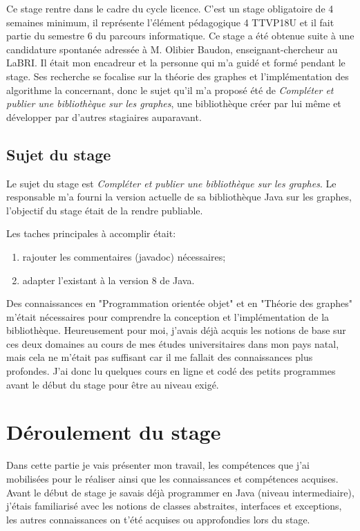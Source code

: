 \documentclass[12pt]{report}
\begin{document}
Ce stage rentre dans le cadre du cycle licence. C'est un stage obligatoire de 4 semaines minimum, il représente l'élément pédagogique 4 TTVP18U et il fait partie du semestre 6 du parcours informatique. Ce stage a été obtenue suite à une candidature spontanée adressée à M. Olibier Baudon, enseignant-chercheur au LaBRI. Il était mon encadreur et la personne qui m'a guidé et formé pendant le stage. Ses recherche se focalise sur la théorie des graphes et l'implémentation des algorithme la concernant, donc le sujet qu'il m'a proposé été de \textit{Compléter et publier une bibliothèque sur les graphes}, une bibliothèque créer par lui même et développer par d'autres stagiaires auparavant.

\section{Sujet du stage}

Le sujet du stage est \textit{Compléter et publier une bibliothèque sur les graphes}. Le responsable m'a fourni la version actuelle de sa bibliothèque Java sur les graphes, l'objectif du stage était de la rendre publiable.\newline

Les taches principales à accomplir était:
\begin{enumerate}
\item rajouter les commentaires (javadoc) nécessaires;
\item adapter l'existant à la version 8 de Java.
\end{enumerate}
\newline
Des connaissances en "Programmation orientée objet" et en "Théorie des graphes" m'était nécessaires pour comprendre la conception et l'implémentation de la bibliothèque. Heureusement pour moi, j'avais déjà acquis les notions de base sur ces deux domaines au cours de mes études universitaires dans mon pays natal, mais cela ne m'était pas suffisant car il me fallait des connaissances plus profondes. J'ai donc lu quelques cours en ligne et codé des petits programmes avant le début du stage pour être au niveau exigé. 

\newpage
\chapter{Déroulement du stage}

Dans cette partie je vais présenter mon travail, les compétences que j'ai mobilisées pour le réaliser ainsi que les connaissances et compétences acquises.
Avant le début de stage je savais déjà programmer en Java (niveau intermediaire), j'étais familiarisé avec les notions de classes abstraites, interfaces et exceptions, les autres connaissances on t'été acquises ou approfondies lors du stage.  
\end{document}
